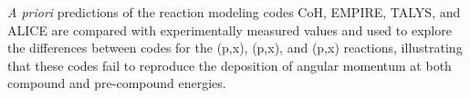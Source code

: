 \emph{A priori} predictions of the reaction modeling codes  CoH, EMPIRE, TALYS, and ALICE are compared with experimentally measured values and used to explore the differences between codes for the
(p,x), (p,x), and  (p,x) reactions, illustrating that these codes fail to reproduce the deposition of angular momentum at both compound and pre-compound energies.





